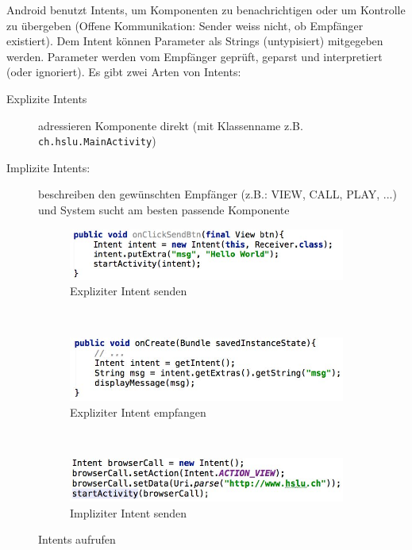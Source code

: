 Android benutzt Intents, um Komponenten zu benachrichtigen oder um Kontrolle zu übergeben (Offene Kommunikation: Sender weiss nicht, ob Empfänger existiert). Dem Intent können Parameter als Strings (untypisiert) mitgegeben werden. Parameter werden vom Empfänger geprüft, geparst und interpretiert (oder ignoriert). Es gibt zwei Arten von Intents:
\begin{description}
	\item[Explizite Intents] adressieren Komponente direkt (mit Klassenname z.B. \texttt{ch.hslu.MainActivity})  
	\item[Implizite Intents:] beschreiben den gewünschten Empfänger (z.B.: VIEW, CALL, PLAY, ...) und System sucht am besten passende Komponente
\end{description}
\begin{figure}
	\centering
	\begin{subfigure}[b]{0.3\textwidth}
		\includegraphics[width=\textwidth]{fig/send-explizit-intent}
		\caption{Expliziter Intent senden}
		\label{fig:send-explizit-intent}
	\end{subfigure}
	~
	\begin{subfigure}[b]{0.3\textwidth}
		\includegraphics[width=\textwidth]{fig/receive-explizit-intent}
		\caption{Expliziter Intent empfangen}
		\label{fig:receive-explizit-intent}
	\end{subfigure}
	~
	\begin{subfigure}[b]{0.3\textwidth}
		\includegraphics[width=\textwidth]{fig/send-implizit-intent}
		\caption{Impliziter Intent senden}
		\label{fig:send-implizit-intent}
	\end{subfigure}
	\caption{Intents aufrufen}
\end{figure}
